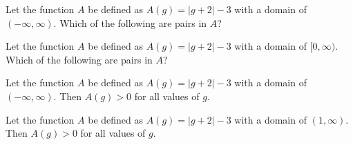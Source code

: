 \documentclass{ximera}
\begin{document}
\begin{exercise}
Let the function $A$ be defined as $A(g) = |g+2|-3$ with a domain of $(-\infty, \infty)$. Which of the following are pairs in $A$?

\begin{selectAll}
\end{selectAll}

\end{exercise}





\begin{exercise}
Let the function $A$ be defined as $A(g) = |g+2|-3$ with a domain of $[0, \infty)$. Which of the following are pairs in $A$?

\begin{selectAll}
\end{selectAll}

\end{exercise}






\begin{exercise}
Let the function $A$ be defined as $A(g) = |g+2|-3$ with a domain of $(-\infty, \infty)$. Then $A(g) > 0$ for all values of $g$.



\begin{multipleChoice}
\end{multipleChoice}

\end{exercise}




\begin{exercise}
Let the function $A$ be defined as $A(g) = |g+2|-3$ with a domain of $(1, \infty)$. Then $A(g) > 0$ for all values of $g$.



\begin{multipleChoice}
\end{multipleChoice}

\end{exercise}
\end{document}
